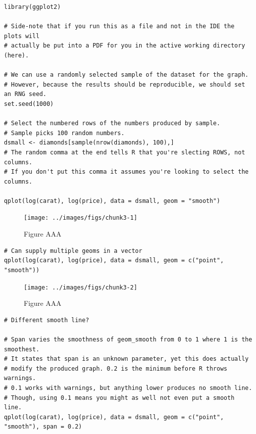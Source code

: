 \begin{verbatim}
library(ggplot2)

# Side-note that if you run this as a file and not in the IDE the plots will
# actually be put into a PDF for you in the active working directory (here).

# We can use a randomly selected sample of the dataset for the graph.
# However, because the results should be reproducible, we should set an RNG seed.
set.seed(1000)

# Select the numbered rows of the numbers produced by sample.
# Sample picks 100 random numbers.
dsmall <- diamonds[sample(nrow(diamonds), 100),]
# The random comma at the end tells R that you're slecting ROWS, not columns.
# If you don't put this comma it assumes you're looking to select the columns.

qplot(log(carat), log(price), data = dsmall, geom = "smooth")
\end{verbatim}

\begin{figure}[H]

{\centering \texttt{[image: ../images/figs/chunk3-1]} 

}

\caption{Figure AAA}\label{fig:chunk3-1}
\end{figure}

\begin{verbatim}
# Can supply multiple geoms in a vector
qplot(log(carat), log(price), data = dsmall, geom = c("point", "smooth"))
\end{verbatim}

\begin{figure}[H]

{\centering \texttt{[image: ../images/figs/chunk3-2]} 

}

\caption{Figure AAA}\label{fig:chunk3-2}
\end{figure}

\begin{verbatim}
# Different smooth line?

# Span varies the smoothness of geom_smooth from 0 to 1 where 1 is the smoothest.
# It states that span is an unknown parameter, yet this does actually
# modify the produced graph. 0.2 is the minimum before R throws warnings.
# 0.1 works with warnings, but anything lower produces no smooth line.
# Though, using 0.1 means you might as well not even put a smooth line.
qplot(log(carat), log(price), data = dsmall, geom = c("point", "smooth"), span = 0.2)
\end{verbatim}

